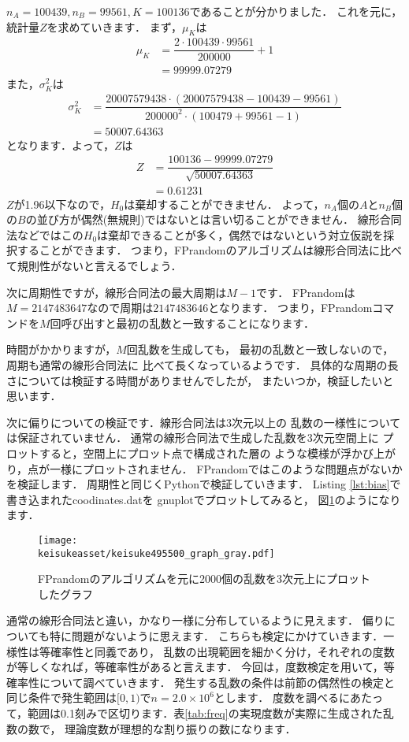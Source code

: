 $n_A = 100439, n_B = 99561, K = 100136$であることが分かりました．
これを元に，統計量$Z$を求めていきます．
まず，$\mu_K$は
\begin{align*}
\mu_K &= \dfrac{2\cdot 100439\cdot 99561}{200000} + 1 \\
&= 99999.07279
\end{align*}
また，$\sigma_K^2$は
\begin{align*}
  \sigma_K^2 &= \dfrac{20007579438\cdot
  (20007579438 - 100439 - 99561)}
  {200000^2\cdot(100479 + 99561 - 1)} \\
  &= 50007.64363
\end{align*}
となります．よって，$Z$は
\begin{align*}
Z &= \dfrac{100136 - 99999.07279}{\sqrt{50007.64363}} \\
&= 0.61231
\end{align*}
$Z$が1.96以下なので，$H_0$は棄却することができません．
よって，$n_A$個の$A$と$n_B$個の$B$の並び方が偶然(無規則)ではないとは言い切ることができません．
線形合同法などではこの$H_0$は棄却できることが多く，偶然ではないという対立仮説を採択することができます．
つまり，FPrandomのアルゴリズムは線形合同法に比べて規則性がないと言えるでしょう．

次に周期性ですが，線形合同法の最大周期は$M-1$です．
FPrandomは$M=2147483647$なので周期は$2147483646$となります．
つまり，FPrandomコマンドを$M$回呼び出すと最初の乱数と一致することになります．

{
}
時間がかかりますが，$M$回乱数を生成しても，
最初の乱数と一致しないので，周期も通常の線形合同法に
比べて長くなっているようです．
具体的な周期の長さについては検証する時間がありませんでしたが，
またいつか，検証したいと思います．

次に偏りについての検証です．線形合同法は3次元以上の
乱数の一様性については保証されていません．
通常の線形合同法で生成した乱数を3次元空間上に
プロットすると，空間上にプロット点で構成された層の
ような模様が浮かび上がり，点が一様にプロットされません．
FPrandomではこのような問題点がないかを検証します．
周期性と同じくPythonで検証していきます．
{
\label{lst:bias}
}
Listing \ref{lst:bias}で書き込まれたcoodinates.datを
gnuplotでプロットしてみると，
図\ref{fig:bias}のようになります．
\begin{figure}[htbp]
  \centering
  \texttt{[image: \\keisukeasset/keisuke495500\_graph\_gray.pdf]}
  \caption{FPrandomのアルゴリズムを元に2000個の乱数を3次元上にプロットしたグラフ}
  \label{fig:bias}
\end{figure}
通常の線形合同法と違い，かなり一様に分布しているように見えます．
偏りについても特に問題がないように思えます．
こちらも検定にかけていきます．一様性は等確率性と同義であり，
乱数の出現範囲を細かく分け，それぞれの度数が等しくなれば，等確率性があると言えます．
今回は，度数検定を用いて，等確率性について調べていきます．
発生する乱数の条件は前節の偶然性の検定と同じ条件で発生範囲は$[0,1)$で$n = 2.0 \times 10^6$とします．
度数を調べるにあたって，範囲は0.1刻みで区切ります．表\ref{tab:freq}の実現度数が実際に生成された乱数の数で，
理論度数が理想的な割り振りの数になります．

